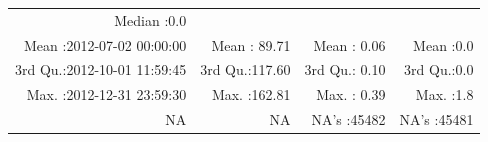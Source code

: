 \documentclass[
  10pt,
  a4paper,oneside]{article}
\begin{document}
\begin{longtable}[]{@{}rrrr@{}}
\begin{minipage}[t]{0.18\columnwidth}
Median :0.0\strut
\end{minipage}\tabularnewline
\begin{minipage}[t]{0.34\columnwidth}\raggedleft
Mean :2012-07-02 00:00:00\strut
\end{minipage} & \begin{minipage}[t]{0.19\columnwidth}\raggedleft
Mean : 89.71\strut
\end{minipage} & \begin{minipage}[t]{0.18\columnwidth}\raggedleft
Mean : 0.06\strut
\end{minipage} & \begin{minipage}[t]{0.18\columnwidth}\raggedleft
Mean :0.0\strut
\end{minipage}\tabularnewline
\begin{minipage}[t]{0.34\columnwidth}\raggedleft
3rd Qu.:2012-10-01 11:59:45\strut
\end{minipage} & \begin{minipage}[t]{0.19\columnwidth}\raggedleft
3rd Qu.:117.60\strut
\end{minipage} & \begin{minipage}[t]{0.18\columnwidth}\raggedleft
3rd Qu.: 0.10\strut
\end{minipage} & \begin{minipage}[t]{0.18\columnwidth}\raggedleft
3rd Qu.:0.0\strut
\end{minipage}\tabularnewline
\begin{minipage}[t]{0.34\columnwidth}\raggedleft
Max. :2012-12-31 23:59:30\strut
\end{minipage} & \begin{minipage}[t]{0.19\columnwidth}\raggedleft
Max. :162.81\strut
\end{minipage} & \begin{minipage}[t]{0.18\columnwidth}\raggedleft
Max. : 0.39\strut
\end{minipage} & \begin{minipage}[t]{0.18\columnwidth}\raggedleft
Max. :1.8\strut
\end{minipage}\tabularnewline
\begin{minipage}[t]{0.34\columnwidth}\raggedleft
NA\strut
\end{minipage} & \begin{minipage}[t]{0.19\columnwidth}\raggedleft
NA\strut
\end{minipage} & \begin{minipage}[t]{0.18\columnwidth}\raggedleft
NA's :45482\strut
\end{minipage} & \begin{minipage}[t]{0.18\columnwidth}\raggedleft
NA's :45481\strut
\end{minipage}\tabularnewline
\bottomrule
\end{longtable}
\end{document}
